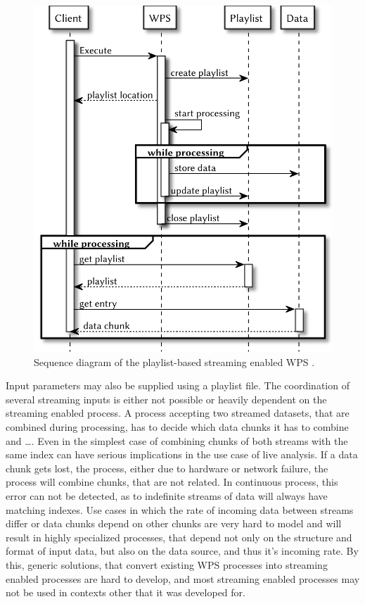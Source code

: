 	\begin{figure}[!htb]
		\centering
		\includegraphics[width=.6\textwidth]{figures/sequence-diagramm-previous.pdf}
		\caption{\label{fig:sd:previous} Sequence diagram of the playlist-based streaming enabled WPS \citep{foerster2012live}.}
	\end{figure}

	Input parameters may also be supplied using a playlist file. The coordination of several streaming inputs is either not possible or heavily dependent on the streaming enabled process. A process accepting two streamed datasets, that are combined during processing, has to decide which data chunks it has to combine and \dots. Even in the simplest case of combining chunks of both streams with the same index can have serious implications in the use case of live analysis. If a data chunk gets lost, the process, either due to hardware or network failure, the process will combine chunks, that are not related. In continuous process, this error can not be detected, as to indefinite streams of data will always have matching indexes. Use cases in which the rate of incoming data between streams differ or data chunks depend on other chunks are very hard to model and will result in highly specialized processes, that
	depend not only on the structure and format of input data, but also on the data source, and thus it's incoming rate. By this, generic solutions, that convert existing \ac{WPS} processes into streaming enabled processes are hard to develop, and most streaming enabled processes may not be used in contexts other that it was developed for.

